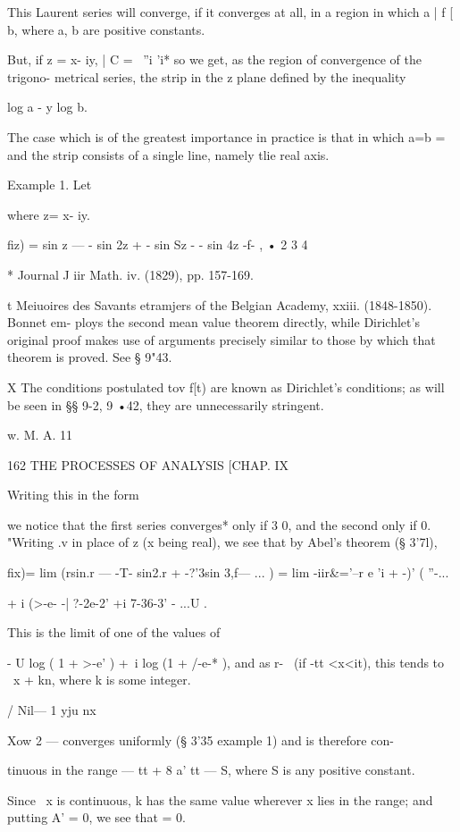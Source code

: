 This Laurent series will converge, if it converges at all, in a region
in which a | f [ b, where a, b are positive constants.

But, if z = x- iy, | C = ~''i 'i* so we get, as the region of
convergence of the trigono- metrical series, the strip in the z plane
defined by the inequality

log a - y log b.

The case which is of the greatest importance in practice is that in
which a=b = \, and the strip consists of a single line, namely tlie
real axis.

Example 1. Let

where z= x- iy.

fiz) = sin z — - sin 2z + - sin Sz - - sin 4z -f- , • 2 3 4

* Journal J iir Math. iv. (1829), pp. 157-169.

t Meiuoires des Savants etramjers of the Belgian Academy, xxiii.
(1848-1850). Bonnet em- ploys the second mean value theorem directly,
while Dirichlet's original proof makes use of arguments precisely
similar to those by which that theorem is proved. See § 9"43.

X The conditions postulated tov f[t) are known as Dirichlet's
conditions; as will be seen in §§ 9-2, 9 •42, they are unnecessarily
stringent.

w. M. A. 11

162 THE PROCESSES OF ANALYSIS [CHAP. IX

Writing this in the form

we notice that the first series converges* only if 3 0, and the second
only if 0. "Writing .v in place of z (x being real), we see that by
Abel's theorem (§ 3'7l),

fix)= lim (rsin.r — -T- sin2.r + -?'3sin 3,f— ... ) = lim -iir\&='--r
e 'i + -)' ( ''-...\

+ i (>-e- -| ?-2e-2' +i 7-36-3' - ...U .

This is the limit of one of the values of

- U log ( 1 + >-e' ) +\ i log (1 + /-e-* ), and as r- \ (if -tt
<x<it), this tends to \ x + kn, where k is some integer.

  / Nil— 1 yju nx

Xow 2 — converges uniformly (§ 3'35 example 1) and is therefore con-

tinuous in the range — tt + 8 a' tt — S, where S is any positive
constant.

Since \ x is continuous, k has the same value wherever x lies in the
range; and putting A' = 0, we see that = 0.

